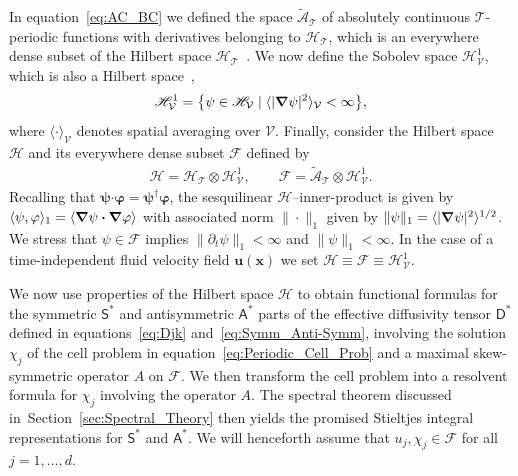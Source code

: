 \documentclass[leqno,onefignum,onetabnum]{siamltex1213}
\newcommand{\secref}[1]{Section~\ref{#1}}
\newcommand{\Tc}{\mathcal{T}}
\newcommand{\Vc}{\mathcal{V}}
\newcommand{\Dm}{\mathsf{D}}
\newcommand{\Sm}{\mathsf{S}}
\newcommand{\Am}{\mathsf{A}}
\newcommand{\Hs}{\mathscr{H}}
\newcommand{\As}{\mathscr{A}}
\newcommand{\Fs}{\mathscr{F}}
\newcommand\bnabla{\mbox{\boldmath${\nabla}$}}
\providecommand\bcdot{\boldsymbol{\cdot}}
\newcommand{\vecx}{\boldsymbol{x}}
\newcommand{\vecu}{\boldsymbol{u}}
\newcommand{\vecpsi}{\boldsymbol{\psi}}
\newcommand{\vecvarphi}{\boldsymbol{\varphi}}
\begin{document}
In equation~\eqref{eq:AC_BC} we defined the space $\tilde{\As}_{\Tc}$ of
absolutely continuous $\Tc$-periodic functions with derivatives
belonging to $\Hs_{\Tc}$, which is an everywhere dense subset of
the Hilbert space $\Hs_{\Tc}$~\cite{Stone:64}. We now define the Sobolev
space $\Hs^1_{\Vc}$, which is also a Hilbert
space~\cite{Bhattacharya:AAP:1999:951,Folland:95:PDEs,McOwen:2003:PDE},            
% 
\begin{align}\label{eq:Sobolev}
  \Hs^1_{\Vc}=\big\{\psi\in \Hs_{\Vc} \; | \; \langle|\bnabla \psi|^2\rangle_{\Vc}<\infty\big\}, 
\end{align}
%
where $\langle\cdot\rangle_{\Vc}$ 
denotes spatial averaging over $\Vc$.  Finally, consider the Hilbert
space $\Hs$ and its everywhere dense subset $\Fs$ defined by
%
\begin{align}\label{eq:Function_Space_Scalar}
  \Hs=\Hs_{\Tc}\otimes\Hs^1_{\Vc}, \qquad
  \Fs=\tilde{\As}_{\Tc}\otimes\Hs^1_{\Vc}.
\end{align}
%
Recalling that $\vecpsi\bcdot\vecvarphi=\vecpsi^\dagger\vecvarphi$, the sesquilinear
$\Hs$--inner-product is given by $\langle\psi,\varphi\rangle_1=\left\langle\bnabla \psi\bcdot\bnabla \varphi \right\rangle$ with associated norm
$\|\cdot\|_1$ given by $\|\psi\|_1= \langle|\bnabla \psi|^2\rangle^{1/2}$. We stress that $\psi\in\Fs$
implies $\|\partial_t\psi\|_1<\infty$ and $\|\psi\|_1<\infty$. In the case of a time-independent
fluid velocity field $\vecu(\vecx)$ we set $\Hs\equiv\Fs\equiv\Hs^1_{\Vc}$. 





We now use properties of the Hilbert space $\Hs$ to obtain
functional formulas for the symmetric $\Sm^*$ and antisymmetric
$\Am^*$ parts of the effective diffusivity tensor $\Dm^*$ defined in
equations~\eqref{eq:Djk} and~\eqref{eq:Symm_Anti-Symm}, involving the
solution $\chi_j$ of the cell problem in
equation~\eqref{eq:Periodic_Cell_Prob} and a maximal skew-symmetric
operator $A$ on $\Fs$. We then transform the cell 
problem into a resolvent formula for $\chi_j$ involving the operator
$A$. The spectral theorem discussed in~\secref{sec:Spectral_Theory}
then yields the promised Stieltjes integral representations for
$\Sm^*$ and $\Am^*$. We will henceforth assume that $u_j,\chi_j\in\Fs$ 
for all $j=1,\ldots,d$.
\end{document}
